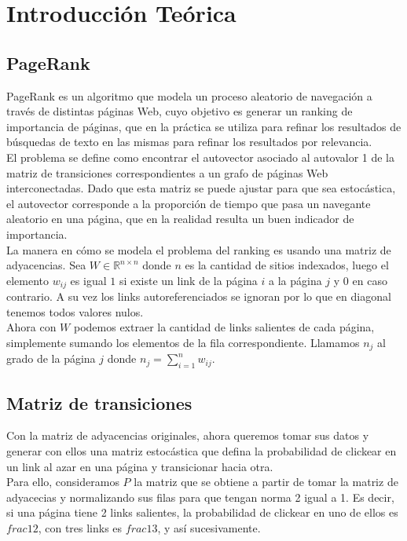 \section{Introducción Teórica}

\subsection{PageRank}

PageRank es un algoritmo que modela un proceso aleatorio de navegación a través de
distintas páginas Web, cuyo objetivo es generar un ranking de importancia de páginas,
que en la práctica se utiliza para refinar los resultados de búsquedas de texto en las mismas
para refinar los resultados por relevancia.\\

El problema se define como encontrar el autovector asociado al autovalor 1 de la matriz de transiciones
correspondientes a un grafo de páginas Web interconectadas. Dado que esta matriz se puede ajustar
para que sea estocástica, el autovector corresponde a la proporción de tiempo que pasa un navegante
aleatorio en una página, que en la realidad resulta un buen indicador de importancia.\\

La manera en cómo se modela el problema del ranking es usando una matriz de adyacencias.
Sea $W \in \mathbb{R}^{n \times n}$ donde $n$ es la cantidad de sitios indexados, luego el elemento
$w_{ij}$ es igual $1$ si existe un link de la página $i$ a la página $j$ y $0$ en caso
contrario. A su vez los links autoreferenciados se ignoran por lo que en diagonal tenemos todos valores nulos.\\

Ahora con $W$ podemos extraer la cantidad de links salientes de cada página,
simplemente sumando los elementos de la fila correspondiente. Llamamos $n_j$
al grado de la página $j$ donde $n_j = \sum^{n}_{i = 1} w_{ij}$.

\subsection{Matriz de transiciones}

Con la matriz de adyacencias originales, ahora queremos tomar sus datos y generar con ellos
una matriz estocástica que defina la probabilidad de clickear en un link al azar
en una página y transicionar hacia otra.\\

Para ello, consideramos $P$ la matriz que se obtiene a partir de tomar la matriz de
adyacecias y normalizando sus filas para que tengan norma 2 igual a 1. Es decir,
si una página tiene 2 links salientes, la probabilidad de clickear en uno de ellos
es $frac{1}{2}$, con tres links es $frac{1}{3}$, y así sucesivamente.\\


